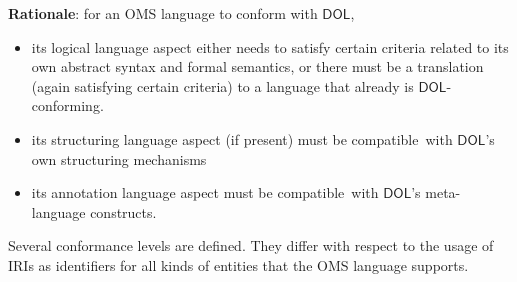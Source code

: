 \documentclass[10pt,fleqn,final]{scrreprt}
\makeatletter
\newcommand*\CommentAuthor{}
\renewcommand*\CommentAuthor{#1}}
\newcommand*\CommentDate{}
\renewcommand*\CommentDate{#1}}
\newcommand*\CommentId{}
\renewcommand*\CommentId{#1}}
\newcommand*\CommentType{}
\renewcommand*\CommentType{#1}}
\newcommand*{\SetCommentColorByType}[1]{%
\edef\localType{{#1}}%
\expandafter\ifstrequal\localType{q-aut}{\colorlet{CommentColor}{red}}{%
\expandafter\ifstrequal\localType{q-all}{\colorlet{CommentColor}{orange}}{%
\expandafter\ifstrequal\localType{todo}{\colorlet{CommentColor}{orange}}{%
\expandafter\ifstrequal\localType{fyi}{\colorlet{CommentColor}{lightgray}}{%
\colorlet{CommentColor}{yellow}}}}}}
\newcommand*{\SetCommentPrefixByType}[1]{%
\edef\localType{{#1}}%
\expandafter\@ifmtarg\localType{%
\edef\CommentPrefix{}%
}{%
\caseupper[q]{#1}%
\edef\CommentPrefix{\thestring: }%
}}
\newcommand*{\initComment}[1]{%
\setkeys{Comment}{#1}%
\SetCommentColorByType{\CommentType}%
\relax%
\SetCommentPrefixByType{\CommentType}%
\relax%
}
\newcommand*{\todonote}[2][]{%
\initComment{#1}%
\pdfcomment[author=\CommentAuthor,color=CommentColor,date=\CommentDate,id=\CommentId]{%
\CommentPrefix
#2}}
\renewcommand*{\todonote}[2][]{%
\initComment{#1}%
\ednote{\CommentPrefix #2}}
\newcommand*{\DOL}{\ensuremath{\mathsf{DOL}}\xspace}
\makeatother
\begin{document}
\begin{fminipage}{\textwidth}
\textbf{Rationale}: for an OMS language to conform with \DOL,
\begin{itemize}
\item its logical language aspect either needs to satisfy certain criteria  related to its own abstract syntax and formal semantics, or there must be a translation (again satisfying certain
criteria) to a language that already is \DOL-conforming.
\item its structuring language aspect (if present) must  be compatible\ with \DOL's own structuring
mechanisms
\item its annotation language aspect must  be compatible\ with \DOL's meta-language constructs.
\end{itemize}
 Several conformance levels are defined. They differ with respect to the usage of IRIs as identifiers for all kinds 
of entities that the OMS language supports.
\end{fminipage}


%
%
\end{document}
